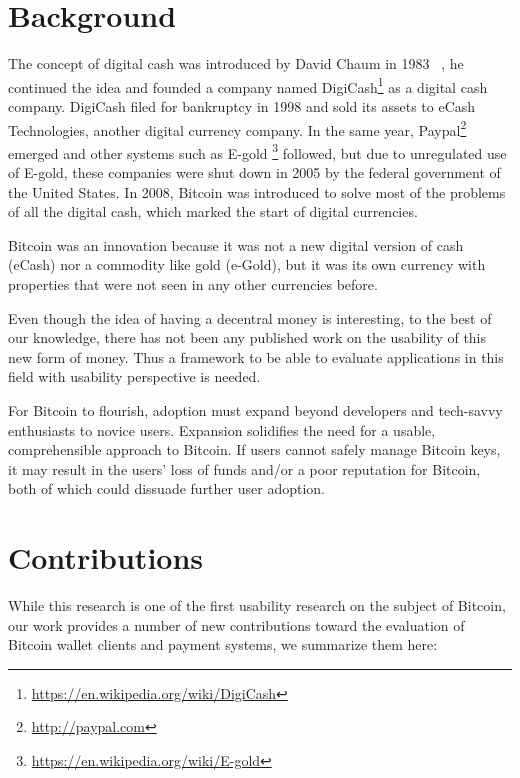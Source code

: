 \section{Background}
The concept of digital cash was introduced by David Chaum in 1983 ~\cite{chaum1983blind}, he continued the idea and founded a company named DigiCash\footnote{\url{https://en.wikipedia.org/wiki/DigiCash}} as a digital cash company. DigiCash filed for bankruptcy in 1998 and sold its assets to eCash Technologies, another digital currency company. In the same year, Paypal\footnote{\url{http://paypal.com}} emerged and other systems such as E-gold \footnote{\url{https://en.wikipedia.org/wiki/E-gold}} followed, but due to unregulated use of E-gold, these companies were shut down in 2005 by the federal government of the United States. In 2008, Bitcoin was introduced to solve most of the problems of all the digital cash, which marked the start of digital currencies.

Bitcoin was an innovation because it was not a new digital version of cash (eCash) nor a commodity like gold (e-Gold), but it was its own currency with properties that were not seen in any other currencies before.

Even though the idea of having a decentral money is interesting, to the best of our knowledge, there has not been any published work on the usability of this new form of money. Thus a framework to be able to evaluate applications in this field with usability perspective is needed.

For Bitcoin to flourish, adoption must expand beyond developers and tech-savvy enthusiasts to novice users. Expansion solidifies the need for a usable, comprehensible approach to Bitcoin. If users cannot safely manage Bitcoin keys, it may result in the users' loss of funds and/or a poor reputation for Bitcoin, both of which could dissuade further user adoption. 






\section{Contributions}
While this research is one of the first usability research on the subject of Bitcoin, our work provides a number of new contributions toward the evaluation of Bitcoin wallet clients and payment systems, we summarize them here:

